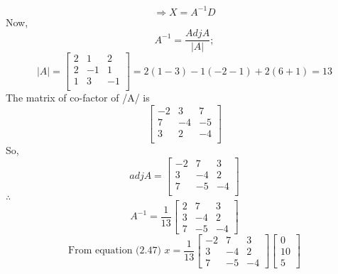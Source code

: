 \documentclass[a4paper, 12pt]{report}
\begin{document}
{\begin{equation}
      \Rightarrow X= A^{-1}D
      \end{equation}
      Now,
      \begin{equation}
      A^{-1}= \frac{AdjA}{|A|}; 
      \end{equation}
      \begin{equation*}|A|= 
      \begin{bmatrix}
      2&1&2\\
      2&-1&1\\
      1&3&-1\\
      \end{bmatrix}
      =
      2(1 - 3) - 1(-2 - 1) + 2(6 + 1)= 13
      \end{equation*}
      The matrix of co-factor of /A/ is
      \begin{equation*}
      \begin{bmatrix}
      -2&3&7\\
      7&-4&-5\\
      3&2&-4\\
      \end{bmatrix}
      \end{equation*}
      So,
      \begin{equation*}adj A=
      \begin{bmatrix}
      -2&7&3\\
      3&-4&2\\
      7&-5&-4\\
      \end{bmatrix}
      \end{equation*}
      $\therefore$  
      \begin{equation*}
       A^{-1}= \frac{1}{13}
      \begin{bmatrix}
      2&7&3\\
      3&-4&2\\
      7&-5&-4
      \end{bmatrix}
      \end{equation*}
      \begin{equation*}
      \text{From equation (2.47) }
      x= \frac {1}{13}
      \begin{bmatrix}
      -2&7&3\\
      3&-4&2\\
      7&-5&-4
      \end{bmatrix}
      \begin{bmatrix}
      0\\
      10\\
      5
      \end{bmatrix}

\end{equation*}}
\end{document}
